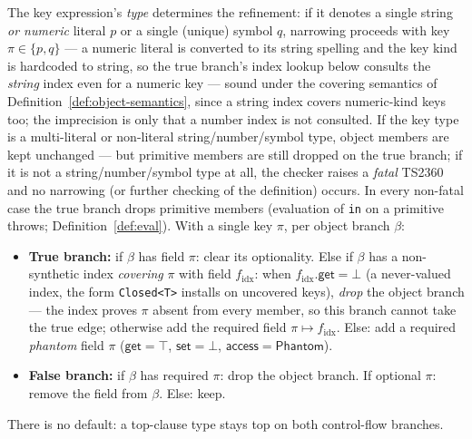 \documentclass[11pt]{article}
\begin{document}
The key expression's \emph{type} determines the refinement: if it denotes a
single string \emph{or numeric} literal $p$ or a single (unique) symbol
$q$, narrowing proceeds with key $\pi \in \{p, q\}$ — a numeric literal is
converted to its string spelling and the key kind is hardcoded to string,
so the true branch's index lookup below consults the \emph{string} index
even for a numeric key — sound under the covering semantics of
Definition~\ref{def:object-semantics}, since a string index covers
numeric-kind keys too; the imprecision is only that a number index is not
consulted. If the key type is a multi-literal or non-literal
string/number/symbol type, object members are kept unchanged — but
primitive members are still dropped on the true branch; if it is not
a string/number/symbol type at all, the checker raises a \emph{fatal}
TS2360 and no narrowing (or further checking of the definition) occurs.
In every non-fatal case the true branch drops primitive members (evaluation
of \texttt{in} on a primitive throws; Definition~\ref{def:eval}). With a
single key $\pi$, per object branch $\beta$:
\begin{itemize}
\item \textbf{True branch:} if $\beta$ has field $\pi$: clear its
  optionality. Else if $\beta$ has a non-synthetic index \emph{covering}
  $\pi$ with field $f_{\mathrm{idx}}$: when
  $f_{\mathrm{idx}}.\mathsf{get} = \bot$ (a never-valued index, the form
  \texttt{Closed<T>} installs on uncovered keys), \emph{drop} the object
  branch — the index proves $\pi$ absent from every member, so this
  branch cannot take the true edge; otherwise add the required field
  $\pi \mapsto f_{\mathrm{idx}}$. Else: add a required \emph{phantom}
  field $\pi$ ($\mathsf{get} = \top$, $\mathsf{set} = \bot$,
  $\mathsf{access} = \mathsf{Phantom}$).
\item \textbf{False branch:} if $\beta$ has required $\pi$: drop the object branch.
  If optional $\pi$: remove the field from $\beta$. Else: keep.
\end{itemize}
There is no default: a top-clause type stays top on both control-flow
branches.
\end{document}
